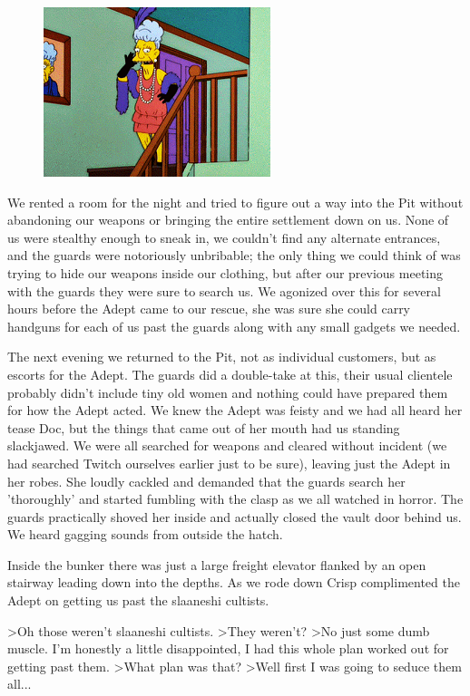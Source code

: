 \begin{figure}
	\begin{center}
		\includegraphics[width=\figwidth]{pics/6/15.png}
	\end{center}
\end{figure}
We rented a room for the night and tried to figure out a way into the Pit without abandoning our weapons or bringing the entire settlement down on us. 
None of us were stealthy enough to sneak in, we couldn't find any alternate entrances, and the guards were notoriously unbribable; 
the only thing we could think of was trying to hide our weapons inside our clothing, but after our previous meeting with the guards they were sure to search us. 
We agonized over this for several hours before the Adept came to our rescue, she was sure she could carry handguns for each of us past the guards along with any small gadgets we needed.

The next evening we returned to the Pit, not as individual customers, but as escorts for the Adept. 
The guards did a double-take at this, their usual clientele probably didn't include tiny old women and nothing could have prepared them for how the Adept acted. 
We knew the Adept was feisty and we had all heard her tease Doc, but the things that came out of her mouth had us standing slackjawed. 
We were all searched for weapons and cleared without incident (we had searched Twitch ourselves earlier just to be sure), leaving just the Adept in her robes. 
She loudly cackled and demanded that the guards search her 'thoroughly' and started fumbling with the clasp as we all watched in horror. 
The guards practically shoved her inside and actually closed the vault door behind us. 
We heard gagging sounds from outside the hatch.

Inside the bunker there was just a large freight elevator flanked by an open stairway leading down into the depths. 
As we rode down Crisp complimented the Adept on getting us past the slaaneshi cultists.

>Oh those weren't slaaneshi cultists.
>They weren't?
>No just some dumb muscle. 
I'm honestly a little disappointed, I had this whole plan worked out for getting past them.
>What plan was that?
>Well first I was going to seduce them all...

